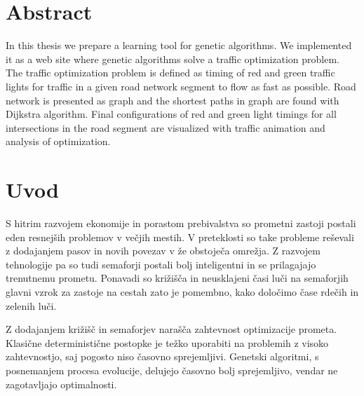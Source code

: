 \documentclass[a4paper, 12pt]{book}
\newcommand{\clearemptydoublepage}{\newpage{\pagestyle{empty}\cleardoublepage}}
\begin{document}
\clearemptydoublepage

\chapter*{Abstract}
In this thesis we prepare a learning tool for genetic algorithms. We implemented it as a web site where genetic algorithms solve a traffic optimization problem. The traffic optimization problem is defined as timing of red and green traffic lights for traffic in a given road network segment to flow as fast as possible. Road network is presented as graph and the shortest paths in graph are found with Dijkstra algorithm. Final configurations of red and green light timings for all intersections in the road segment are visualized with traffic animation and analysis of optimization.

\clearemptydoublepage

\mainmatter
\setcounter{page}{1}
\pagestyle{fancy}

\chapter{Uvod}
\label{ch1}

S hitrim razvojem ekonomije in porastom prebivalstva so prometni zastoji postali eden resnej\v sih problemov v ve\v cjih mestih. V preteklosti so take probleme re\v sevali z dodajanjem pasov in novih povezav v \v ze obstoje\v ca omre\v zja. Z razvojem tehnologije pa so tudi semaforji postali bolj inteligentni in se prilagajajo trenutnemu prometu. 
Ponavadi so kri\v zi\v s\v ca  in neusklajeni \v casi lu\v ci na semaforjih glavni vzrok za zastoje na cestah zato je pomembno, kako dolo\v cimo \v case rde\v cih in zelenih lu\v ci. 
\cite{he12-aes.pdf}

Z dodajanjem kri\v zi\v s\v c in semaforjev nara\v s\v ca zahtevnost optimizacije prometa. Klasi\v cne deterministi\v cne postopke je te\v zko uporabiti na problemih z visoko zahtevnostjo, saj pogosto niso \v casovno sprejemljivi. Genetski algoritmi, s posnemanjem procesa evolucije, delujejo \v casovno bolj sprejemljivo, vendar ne zagotavljajo optimalnosti.
\end{document}
